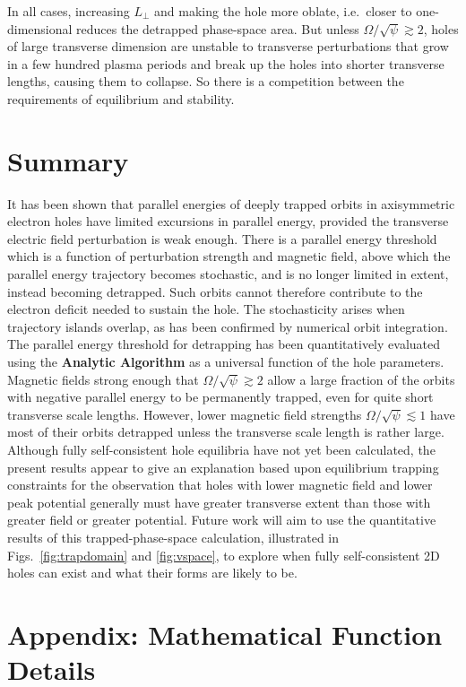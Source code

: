 \documentclass{agujournal2019}
\begin{document}
In all cases, increasing $L_\perp$ and making the hole more oblate,
i.e.\ closer to one-dimensional reduces the detrapped phase-space
area. But unless $\Omega/\sqrt\psi\gtrsim 2$, holes of large
transverse dimension are unstable to transverse perturbations that
grow in a few hundred plasma periods and break up the holes into
shorter transverse lengths, causing them to collapse. So there is a
competition between the requirements of equilibrium and stability.


\section{Summary}

It has been shown that parallel energies of deeply trapped orbits in
axisymmetric electron holes have limited excursions in parallel
energy, provided the transverse electric field perturbation is weak
enough. There is a parallel energy threshold which is a function of
perturbation strength and magnetic field, above which the parallel
energy trajectory becomes stochastic, and is no longer limited in
extent, instead becoming detrapped. Such orbits cannot therefore
contribute to the electron deficit needed to sustain the hole. The
stochasticity arises when trajectory islands overlap, as has been
confirmed by numerical orbit integration. The parallel energy
threshold for detrapping has been quantitatively evaluated using the
\textbf{Analytic Algorithm} as a universal function of the hole
parameters. Magnetic fields strong enough that
$\Omega/\sqrt\psi\gtrsim 2$ allow a large fraction of the orbits with
negative parallel energy to be permanently trapped, even for quite
short transverse scale lengths. However, lower magnetic field
strengths $\Omega/\sqrt\psi\lesssim 1$ have most of their orbits
detrapped unless the transverse scale length is rather large. Although
fully self-consistent hole equilibria have not yet been calculated,
the present results appear to give an explanation based upon
equilibrium trapping constraints for the observation that holes with
lower magnetic field and lower peak potential generally must have
greater transverse extent than those with greater field or greater
potential. Future work will aim to use the quantitative results of
this trapped-phase-space calculation, illustrated in Figs.\
\ref{fig:trapdomain} and \ref{fig:vspace}, to explore when fully
self-consistent 2D holes can exist and what their forms are likely to
be.

\section*{Appendix: Mathematical Function Details}
\end{document}
